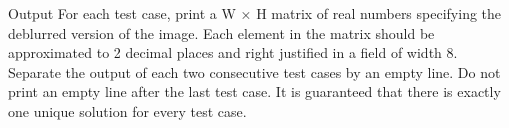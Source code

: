 Output
For each test case, print a W × H matrix of real numbers specifying the deblurred version of the image. Each element in the matrix should be approximated to 2 decimal places and right justified in a field of width 8. Separate the output of each two consecutive test cases by an empty line. Do not print an empty line after the last test case. It is guaranteed that there is exactly one unique solution for every test case.